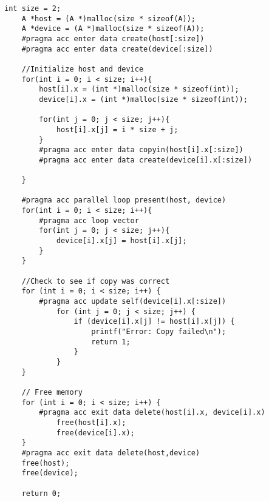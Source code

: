 \begin{Code}
\begin{lstlisting}[frame=single, caption=manualdeepcopy.c, label=prototype, numbers=none]
int size = 2;
	A *host = (A *)malloc(size * sizeof(A));
	A *device = (A *)malloc(size * sizeof(A));
	#pragma acc enter data create(host[:size])
	#pragma acc enter data create(device[:size])

	//Initialize host and device
	for(int i = 0; i < size; i++){
		host[i].x = (int *)malloc(size * sizeof(int));
		device[i].x = (int *)malloc(size * sizeof(int));
		
		for(int j = 0; j < size; j++){
			host[i].x[j] = i * size + j;
		}
		#pragma acc enter data copyin(host[i].x[:size])
		#pragma acc enter data create(device[i].x[:size])

	}

	#pragma acc parallel loop present(host, device)
	for(int i = 0; i < size; i++){
		#pragma acc loop vector
		for(int j = 0; j < size; j++){
			device[i].x[j] = host[i].x[j];
		}
	}

	//Check to see if copy was correct
	for (int i = 0; i < size; i++) {
		#pragma acc update self(device[i].x[:size])
    		for (int j = 0; j < size; j++) {
      			if (device[i].x[j] != host[i].x[j]) {
        			printf("Error: Copy failed\n");
        			return 1;
      			}
    		}
  	}

  	// Free memory
  	for (int i = 0; i < size; i++) {
		#pragma acc exit data delete(host[i].x, device[i].x)
    		free(host[i].x);
    		free(device[i].x);
  	}
	#pragma acc exit data delete(host,device)
  	free(host);
  	free(device);

	return 0;
\end{lstlisting}
\end{Code}